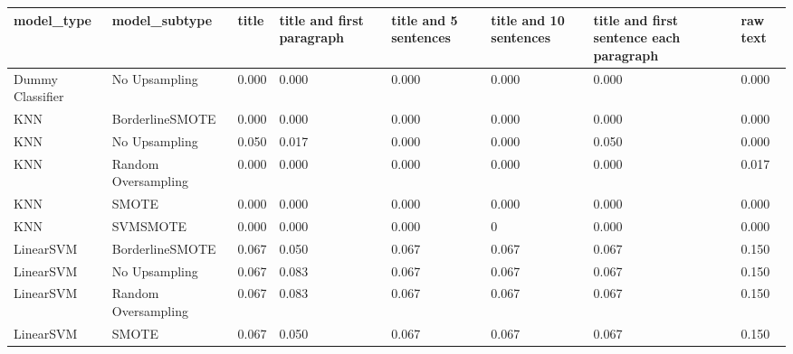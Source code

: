 \begin{tabular}{llllllll}
\toprule
                  model\_type &       model\_subtype & title & title and first paragraph & title and 5 sentences & title and 10 sentences & title and first sentence each paragraph & raw text \\
\midrule
            Dummy Classifier &       No Upsampling & 0.000 &                     0.000 &                 0.000 &                  0.000 &                                   0.000 &    0.000 \\
                         KNN &     BorderlineSMOTE & 0.000 &                     0.000 &                 0.000 &                  0.000 &                                   0.000 &    0.000 \\
                         KNN &       No Upsampling & 0.050 &                     0.017 &                 0.000 &                  0.000 &                                   0.050 &    0.000 \\
                         KNN & Random Oversampling & 0.000 &                     0.000 &                 0.000 &                  0.000 &                                   0.000 &    0.017 \\
                         KNN &               SMOTE & 0.000 &                     0.000 &                 0.000 &                  0.000 &                                   0.000 &    0.000 \\
                         KNN &            SVMSMOTE & 0.000 &                     0.000 &                 0.000 &                      0 &                                   0.000 &    0.000 \\
                   LinearSVM &     BorderlineSMOTE & 0.067 &                     0.050 &                 0.067 &                  0.067 &                                   0.067 &    0.150 \\
                   LinearSVM &       No Upsampling & 0.067 &                     0.083 &                 0.067 &                  0.067 &                                   0.067 &    0.150 \\
                   LinearSVM & Random Oversampling & 0.067 &                     0.083 &                 0.067 &                  0.067 &                                   0.067 &    0.150 \\
                   LinearSVM &               SMOTE & 0.067 &                     0.050 &                 0.067 &                  0.067 &                                   0.067 &    0.150 \\

\end{tabular}
